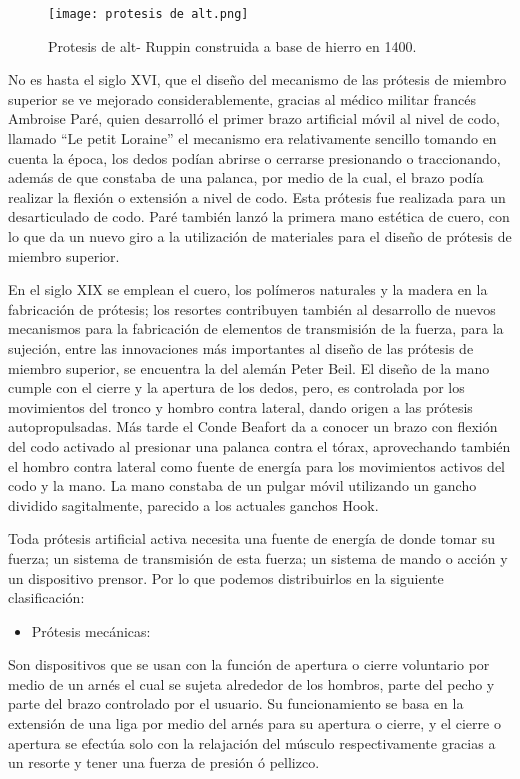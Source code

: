 \documentclass[a4paper]{article}
\begin{document}
\begin{figure}[h]
\centering
\texttt{[image: protesis de alt.png]}
\caption{\label{fig:biomec3}Protesis de alt- Ruppin construida a base de hierro en 1400.}
\end{figure}

No es hasta el siglo XVI, que el diseño del mecanismo de las prótesis de miembro superior se ve mejorado considerablemente, gracias al médico militar francés Ambroise Paré, quien desarrolló el primer brazo artificial móvil al nivel de codo, llamado “Le petit Loraine” el mecanismo era relativamente sencillo tomando en cuenta la época, los dedos podían abrirse o cerrarse presionando o traccionando, además de que constaba de una palanca, por medio de la cual, el brazo podía realizar la flexión o extensión a nivel de codo. Esta prótesis fue realizada para un desarticulado de codo. Paré también lanzó la primera mano estética de cuero, con lo que da un nuevo giro a la utilización de materiales para el diseño de prótesis de miembro superior. 

En el siglo XIX se emplean el cuero, los polímeros naturales y la madera en la fabricación de prótesis; los resortes contribuyen también al desarrollo de nuevos mecanismos para la fabricación de elementos de transmisión de la fuerza, para la sujeción, entre las innovaciones más importantes al diseño de las prótesis de miembro superior, se encuentra la del alemán Peter Beil. El diseño de la mano cumple con el cierre y la apertura de los dedos, pero, es controlada por los movimientos del tronco y hombro contra lateral, dando origen a las prótesis autopropulsadas. Más tarde el Conde Beafort da a conocer un brazo con flexión del codo activado al presionar una palanca contra el tórax, aprovechando también el hombro contra lateral como fuente de energía para los movimientos activos del codo y la mano. La mano constaba de un pulgar móvil utilizando un gancho dividido sagitalmente, parecido a los actuales ganchos Hook\cite{ff6}.

Toda prótesis artificial activa necesita una fuente de energía de donde tomar su fuerza; un sistema de transmisión de esta fuerza; un sistema de mando o acción y un dispositivo prensor. Por lo que podemos distribuirlos en la siguiente clasificación: 

\begin{itemize}
    \item Prótesis mecánicas:
\end{itemize}
Son dispositivos que se usan con la función de apertura o cierre voluntario por medio de un arnés el cual se sujeta alrededor de los hombros, parte del pecho y parte del brazo controlado por el usuario. Su funcionamiento se basa en la extensión de una liga por medio del arnés para su apertura o cierre, y el cierre o apertura se efectúa solo con la relajación del músculo respectivamente gracias a un resorte y tener una fuerza de presión ó pellizco.
\end{document}
